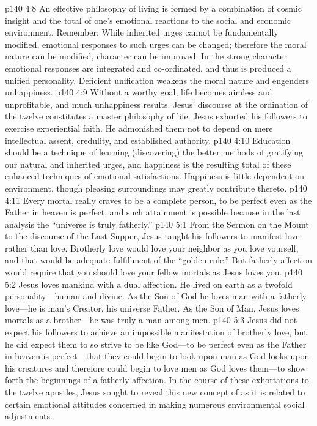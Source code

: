 \pc \vs p140 4:8 An effective philosophy of living is formed by a combination of cosmic insight and the total of one’s emotional reactions to the social and economic environment. Remember: While inherited urges cannot be fundamentally modified, emotional responses to such urges can be changed; therefore the moral nature can be modified, character can be improved. In the strong character emotional responses are integrated and co\hyp{}ordinated, and thus is produced a unified personality. Deficient unification weakens the moral nature and engenders unhappiness.
\vs p140 4:9 Without a worthy goal, life becomes aimless and unprofitable, and much unhappiness results. Jesus’ discourse at the ordination of the twelve constitutes a master philosophy of life. Jesus exhorted his followers to exercise experiential faith. He admonished them not to depend on mere intellectual assent, credulity, and established authority.
\vs p140 4:10 Education should be a technique of learning (discovering) the better methods of gratifying our natural and inherited urges, and happiness is the resulting total of these enhanced techniques of emotional satisfactions. Happiness is little dependent on environment, though pleasing surroundings may greatly contribute thereto.
\pc \vs p140 4:11 Every mortal really craves to be a complete person, to be perfect even as the Father in heaven is perfect, and such attainment is possible because in the last analysis the “universe is truly fatherly.”
\vs p140 5:1 From the Sermon on the Mount to the discourse of the Last Supper, Jesus taught his followers to manifest  love rather than  love. Brotherly love would love your neighbor as you love yourself, and that would be adequate fulfillment of the “golden rule.” But fatherly affection would require that you should love your fellow mortals as Jesus loves you.
\vs p140 5:2 Jesus loves mankind with a dual affection. He lived on earth as a twofold personality---human and divine. As the Son of God he loves man with a fatherly love---he is man’s Creator, his universe Father. As the Son of Man, Jesus loves mortals as a brother---he was truly a man among men.
\vs p140 5:3 Jesus did not expect his followers to achieve an impossible manifestation of brotherly love, but he did expect them to so strive to be like God---to be perfect even as the Father in heaven is perfect---that they could begin to look upon man as God looks upon his creatures and therefore could begin to love men as God loves them---to show forth the beginnings of a fatherly affection. In the course of these exhortations to the twelve apostles, Jesus sought to reveal this new concept of  as it is related to certain emotional attitudes concerned in making numerous environmental social adjustments.
